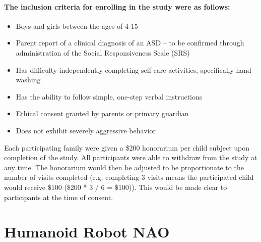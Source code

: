 \documentclass{ut-thesis}
\begin{document}
\paragraph{The \textbf{inclusion criteria} for enrolling in the study were as follows:}
\begin{itemize}
	\item Boys and girls between the ages of 4-15
	\item Parent report of a clinical diagnosis of an ASD – to be confirmed through administration of the Social Responsiveness Scale (SRS)
	\item Has difficulty independently completing self-care activities, specifically hand-washing
	\item Has the ability to follow simple, one-step verbal instructions
	\item Ethical consent  granted by parents or primary guardian
	\item Does not exhibit severely aggressive behavior
\end{itemize}

Each participating family were given a \$200 honorarium per child subject upon completion of the study. All participants were able to withdraw from the study at any time. The honorarium would then be adjusted to be proportionate to the number of visits completed (e.g. completing 3 visits means the participated child would receive \$100 (\$200 * 3 / 6 = \$100)). This would be made clear to participants at the time of consent.

\section{Humanoid Robot NAO}
\end{document}
